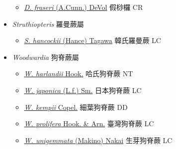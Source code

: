 \begin{itemize}
  \begin{itemize}
        \item[] \href{http://www.theplantlist.org/tpl1.1/search?q=Diploblechnum+fraseri}{\textit{D. fraseri} (A.Cunn.) DeVol}   假桫欏 CR
  \end{itemize}
 \item[] \textit{Struthiopteris} 羅曼蕨屬
                    
  \begin{itemize}
        \item[] \href{http://www.theplantlist.org/tpl1.1/search?q=Struthiopteris+hancockii}{\textit{S. hancockii} (Hance) Tagawa}   韓氏羅曼蕨 LC
  \end{itemize}
 \item[] \textit{Woodwardia} 狗脊蕨屬
                    
  \begin{itemize}
        \item[] \href{http://www.theplantlist.org/tpl1.1/search?q=Woodwardia+harlandii}{\textit{W. harlandii} Hook.}   哈氏狗脊蕨 NT
        \item[] \href{http://www.theplantlist.org/tpl1.1/search?q=Woodwardia+japonica}{\textit{W. japonica} (L.f.) Sm.}   日本狗脊蕨 LC
        \item[] \href{http://www.theplantlist.org/tpl1.1/search?q=Woodwardia+kempii}{\textit{W. kempii} Copel.}   細葉狗脊蕨 DD
        \item[] \href{http://www.theplantlist.org/tpl1.1/search?q=Woodwardia+prolifera}{\textit{W. prolifera} Hook. \& Arn.}     臺灣狗脊蕨 LC
        \item[] \href{http://www.theplantlist.org/tpl1.1/search?q=Woodwardia+unigemmata}{\textit{W. unigemmata} (Makino) Nakai}   生芽狗脊蕨 LC
  \end{itemize}
  \end{itemize}
